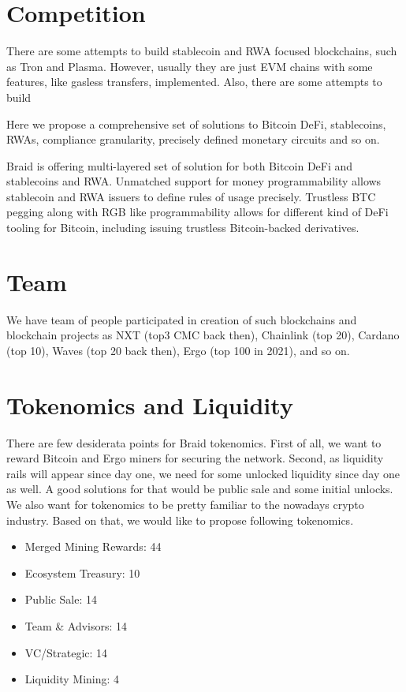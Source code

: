 \documentclass{llncs}   %
\newcommand{\bc}{Braid}
\begin{document}
\section{Competition}
\label{sec-competition}


There are some attempts to build stablecoin and RWA focused blockchains, such as Tron and Plasma. However, usually they are just EVM chains with some features, like gasless transfers, implemented. Also, there are some attempts to build 

Here we propose a comprehensive set of solutions to Bitcoin DeFi, stablecoins, RWAs,
compliance granularity, precisely defined monetary circuits and so on.  

\bc{} is offering multi-layered set of solution for both Bitcoin DeFi and stablecoins and RWA. Unmatched support for money programmability allows stablecoin and RWA issuers to define rules of usage precisely. Trustless BTC pegging along with RGB like programmability allows for different kind of DeFi tooling for Bitcoin, including issuing trustless Bitcoin-backed derivatives. 


\section{Team}
\label{sec-team}

We have team of people participated in creation of such blockchains and blockchain projects as NXT (top3 CMC back then), Chainlink (top 20),
 Cardano (top 10), Waves (top 20 back then), Ergo (top 100 in 2021), and so on.


\section{Tokenomics and Liquidity}
\label{sec-tokenomics}

There are few desiderata points for Braid tokenomics. First of all, we want to reward Bitcoin and Ergo miners for securing the network. Second, as liquidity rails will appear since day one, we need for some unlocked liquidity since day one as well. A good solutions for that would be public sale and some initial unlocks.  We also want for tokenomics
to be pretty familiar to the nowadays crypto industry. Based on that, we would like to propose following tokenomics.

\begin{itemize}
  \item Merged Mining Rewards: 44
  \item Ecosystem Treasury: 10
  \item Public Sale: 14
  \item Team \& Advisors: 14
  \item VC/Strategic: 14
  \item Liquidity Mining: 4
\end{itemize}
\end{document}
